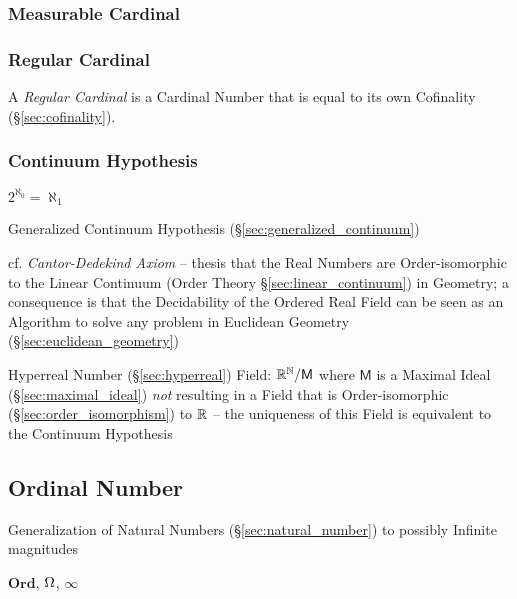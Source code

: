 \subsubsection{Measurable Cardinal}\label{sec:measurable_cardinal}

\subsubsection{Regular Cardinal}\label{sec:regular_cardinal}

A \emph{Regular Cardinal} is a Cardinal Number that is equal to its
own Cofinality (\S\ref{sec:cofinality}).



\subsubsection{Continuum Hypothesis}\label{sec:continuum_hypothesis}

$2^{\aleph_0} = \aleph_1$

Generalized Continuum Hypothesis (\S\ref{sec:generalized_continuum})

cf. \emph{Cantor-Dedekind Axiom} -- thesis that the Real Numbers are
Order-isomorphic to the Linear Continuum (Order Theory
\S\ref{sec:linear_continuum}) in Geometry; a consequence is that the
Decidability of the Ordered Real Field can be seen as an Algorithm to solve any
problem in Euclidean Geometry (\S\ref{sec:euclidean_geometry})

Hyperreal Number (\S\ref{sec:hyperreal}) Field: $\mathbb{R}^{\mathbb{N}} /
\mathsf{M}$ where $\mathsf{M}$ is a Maximal Ideal
(\S\ref{sec:maximal_ideal}) \emph{not} resulting in a Field that is
Order-isomorphic (\S\ref{sec:order_isomorphism}) to $\mathbb{R}$ -- the
uniqueness of this Field is equivalent to the Continuum Hypothesis



\subsection{Ordinal Number}\label{sec:ordinal_number}

Generalization of Natural Numbers (\S\ref{sec:natural_number}) to
possibly Infinite magnitudes %

$\mathbf{Ord}$, $\Omega$, $\infty$

